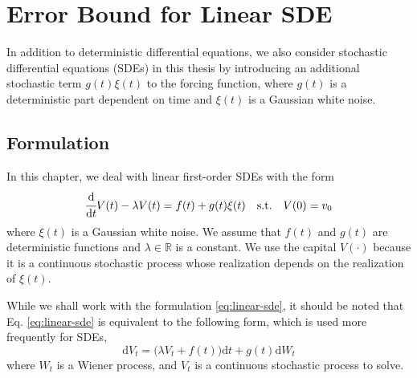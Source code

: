 
\chapter{Error Bound for Linear SDE}  \label{chapter:error-bound-for-linear-sdes}
    In addition to deterministic differential equations, we also consider stochastic differential equations (SDEs) in this thesis by introducing an additional stochastic term $g(t)\xi(t)$ to the forcing function, where $g(t)$ is a deterministic part dependent on time and $\xi(t)$ is a Gaussian white noise.

\section{Formulation}
    In this chapter, we deal with linear first-order SDEs with the form
    \begin{equation}\label{eq:linear-sde}
    \cfrac{\mathrm{d} }{\mathrm{d} t}V(t) - \lambda V(t) = f(t) + g(t) \xi(t) \quad \text{s.t.} \quad V(0) = v_0 
    \end{equation}
    where $\xi(t)$ is a Gaussian white noise. We assume that $f(t)$ and $g(t)$ are deterministic functions and $\lambda \in \mathbb{R}$ is a constant. 
    We use the capital $V(\cdot)$ because it is a continuous stochastic process whose realization depends on the realization of $\xi(t)$.

    While we shall work with the formulation \eqref{eq:linear-sde}, it should be noted that Eq. \eqref{eq:linear-sde} is equivalent to the following form, which is used more frequently for SDEs,
    \begin{equation}
    \mathrm{d}V_t = \big(\lambda V_t + f(t)\big) \mathrm{d}t + g(t) \mathrm{d} W_t
    \end{equation}
    where $W_t$ is a Wiener process, and $V_t$ is a continuous stochastic process to solve.

